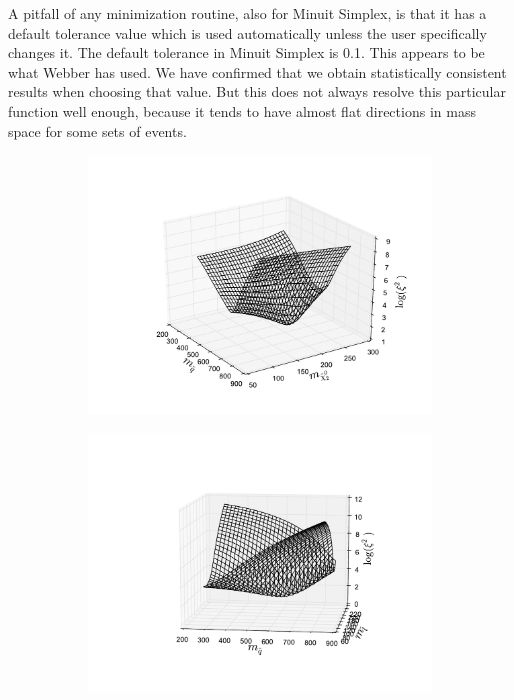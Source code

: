 \documentclass[twoside,english]{uiofysmaster}
\begin{document}
A pitfall of any minimization routine, also for Minuit Simplex, is that it has a default tolerance value which is used automatically unless the user specifically changes it. The default tolerance in Minuit Simplex is 0.1. This appears to be what Webber has used. We have confirmed that we obtain statistically consistent results when choosing that value. But this does not always resolve this particular function well enough, because it tends to have almost flat directions in mass space for some sets of events.
\begin{figure}[hbt]
	\centering
	\begin{subfigure}[b]{0.49\textwidth}
		\includegraphics[width=\textwidth]{figures/3D_plot_xisquared_25_herwig_events_squark-chi2.pdf} 
		\caption{}
		\label{fig:3D_masses1}
	\end{subfigure}
	\begin{subfigure}[b]{0.49\textwidth}
		\includegraphics[width=\textwidth]{figures/3D_plot_xisquared_25_herwig_events_squark-slepton.pdf} 
		\caption{}
		\label{fig:3D_masses2}
	\end{subfigure}


\end{figure}
\end{document}
